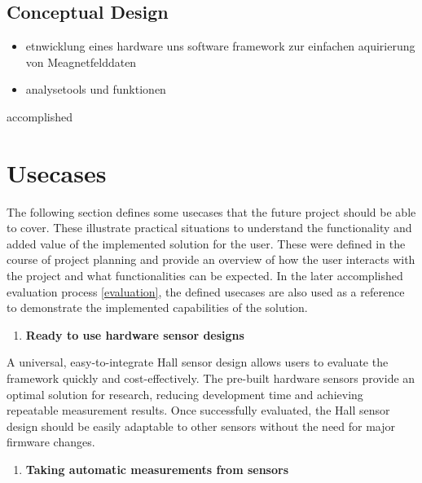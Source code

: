 \hypertarget{conceptual-design}{%
\section{Conceptual Design}\label{conceptual-design}}

\begin{itemize}
\tightlist
\item
  etnwicklung eines hardware uns software framework zur einfachen
  aquirierung von Meagnetfelddaten
\item
  analysetools und funktionen
\end{itemize}

accomplished

\hypertarget{usecases}{%
\chapter{Usecases}\label{usecases}}

The following section defines some usecases that the future project
should be able to cover. These illustrate practical situations to
understand the functionality and added value of the implemented solution
for the user. These were defined in the course of project planning and
provide an overview of how the user interacts with the project and what
functionalities can be expected. In the later accomplished evaluation
process \ref{evaluation}, the defined usecases are also used as a
reference to demonstrate the implemented capabilities of the solution.

\begin{enumerate}
\def\labelenumi{\arabic{enumi}.}
\tightlist
\item
  \textbf{Ready to use hardware sensor designs}
\end{enumerate}

A universal, easy-to-integrate Hall sensor design allows users to
evaluate the framework quickly and cost-effectively. The pre-built
hardware sensors provide an optimal solution for research, reducing
development time and achieving repeatable measurement results. Once
successfully evaluated, the Hall sensor design should be easily
adaptable to other sensors without the need for major firmware changes.

\begin{enumerate}
\def\labelenumi{\arabic{enumi}.}
\setcounter{enumi}{1}
\tightlist
\item
  \textbf{Taking automatic measurements from sensors}
\end{enumerate}


